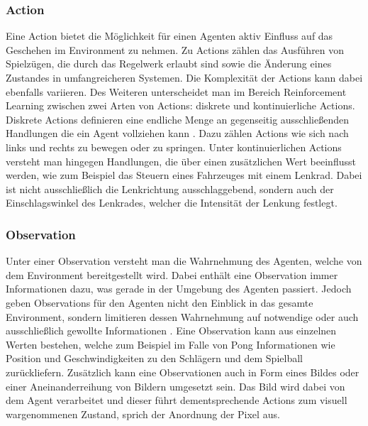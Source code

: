 \documentclass[11pt]{scrartcl}
\begin{document}
\subsubsection{Action}
\label{sec:action}
Eine Action bietet die Möglichkeit für einen Agenten aktiv Einfluss auf das Geschehen im
Environment zu nehmen. Zu Actions zählen das Ausführen von Spielzügen, die durch das
Regelwerk erlaubt sind sowie die Änderung eines Zustandes in umfangreicheren Systemen. Die
Komplexität der Actions kann dabei ebenfalls variieren. Des Weiteren unterscheidet man im Bereich
Reinforcement Learning zwischen zwei Arten von Actions: diskrete und kontinuierliche Actions.
Diskrete Actions definieren eine endliche Menge an gegenseitig ausschließenden Handlungen die ein  %
Agent vollziehen kann \cite[~S.8]{L2018}. Dazu zählen Actions wie sich nach links und rechts zu
bewegen oder zu springen. Unter kontinuierlichen Actions versteht man hingegen Handlungen, die
über einen zusätzlichen Wert beeinflusst werden, wie zum Beispiel das Steuern eines Fahrzeuges
mit einem Lenkrad. Dabei ist nicht ausschließlich die Lenkrichtung ausschlaggebend, sondern auch
der Einschlagswinkel des Lenkrades, welcher die Intensität der Lenkung festlegt.


\subsubsection{Observation}
Unter einer Observation versteht man die Wahrnehmung des Agenten, welche von dem Environment 
bereitgestellt wird. Dabei enthält eine Observation immer Informationen dazu, was gerade in der
Umgebung des Agenten passiert. Jedoch geben Observations für den Agenten nicht den Einblick  %
in das gesamte Environment, sondern limitieren dessen Wahrnehmung auf notwendige oder auch
ausschließlich gewollte Informationen \cite[~S.8 f.]{L2018}. Eine Observation kann aus einzelnen
Werten bestehen, welche zum Beispiel im Falle von Pong Informationen wie Position und
Geschwindigkeiten zu den Schlägern und dem Spielball zurückliefern. Zusätzlich kann eine
Observationen auch in Form eines Bildes oder einer Aneinanderreihung von Bildern umgesetzt sein.
Das Bild wird dabei von dem Agent verarbeitet und dieser führt dementsprechende Actions zum
visuell wargenommenen Zustand, sprich der Anordnung der Pixel aus. 
\end{document}
